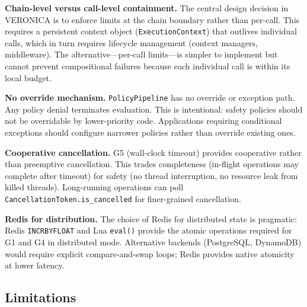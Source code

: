 \documentclass[11pt]{article}
\begin{document}
\textbf{Chain-level versus call-level containment.} The central design
decision in VERONICA is to enforce limits at the chain boundary rather than
per-call. This requires a persistent context object (\texttt{ExecutionContext})
that outlives individual calls, which in turn requires lifecycle management
(context managers, middleware). The alternative---per-call limits---is simpler
to implement but cannot prevent compositional failures because each individual
call is within its local budget.

\textbf{No override mechanism.} \texttt{PolicyPipeline} has no override or
exception path. Any policy denial terminates evaluation. This is intentional:
safety policies should not be overridable by lower-priority code. Applications
requiring conditional exceptions should configure narrower policies rather
than override existing ones.

\textbf{Cooperative cancellation.} G5 (wall-clock timeout) provides
cooperative rather than preemptive cancellation. This trades completeness
(in-flight operations may complete after timeout) for safety (no thread
interruption, no resource leak from killed threads). Long-running operations
can poll \texttt{CancellationToken.is\_cancelled} for finer-grained
cancellation.

\textbf{Redis for distribution.} The choice of Redis for distributed state is
pragmatic: Redis \texttt{INCRBYFLOAT} and Lua \texttt{eval()} provide the
atomic operations required for G1 and G4 in distributed mode. Alternative
backends (PostgreSQL, DynamoDB) would require explicit compare-and-swap loops;
Redis provides native atomicity at lower latency.

\subsection{Limitations}
\end{document}
